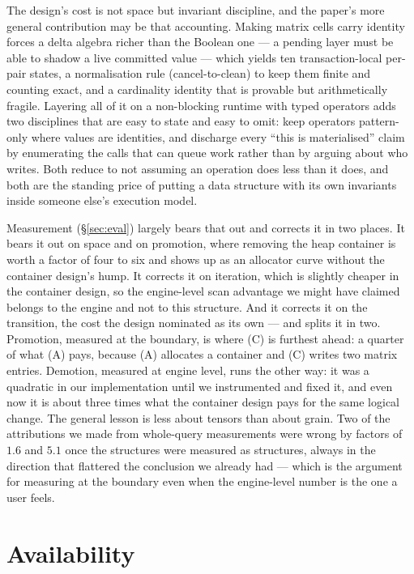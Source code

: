\documentclass[11pt,a4paper]{article}
\theoremstyle{plain}
\theoremstyle{definition}
\theoremstyle{remark}
\begin{document}
The design's cost is not space but invariant discipline, and the
paper's more general contribution may be that accounting. Making matrix cells
carry identity forces a delta algebra richer than the Boolean one --- a
pending layer must be able to shadow a live committed value --- which yields
ten transaction-local per-pair states, a normalisation rule
(cancel-to-clean) to keep them finite and counting exact, and a cardinality
identity that is provable but arithmetically fragile. Layering all of it on a
non-blocking runtime with typed operators adds two disciplines that are easy to
state and easy to omit: keep operators pattern-only where values are
identities, and discharge every ``this is materialised'' claim by enumerating
the calls that can queue work rather than by arguing about who writes. Both
reduce to not assuming an operation does less than it does, and both are the
standing price of putting a data structure with its own invariants inside
someone else's execution model.

Measurement (\S\ref{sec:eval}) largely bears that out and corrects it in two
places. It bears it out on space and on promotion, where removing the heap
container is worth a factor of four to six and shows up as an allocator curve
without the container design's hump. It corrects it on iteration, which is
slightly cheaper in the container design, so the engine-level scan advantage we
might have claimed belongs to the engine and not to this structure. And it
corrects it on the transition, the cost the design nominated as its own --- and
splits it in two. Promotion, measured at the boundary, is where (C) is furthest
ahead: a quarter of what (A) pays, because (A) allocates a container and (C)
writes two matrix entries. Demotion, measured at engine level, runs the other
way: it was a quadratic in our implementation until we instrumented and fixed
it, and even now it is about three times what the container design pays for the
same logical change. The
general lesson is less about tensors than about grain. Two of the attributions
we made from whole-query measurements were wrong by factors of $1.6$ and $5.1$
once the structures were measured as structures, always in the direction that
flattered the conclusion we already had --- which is the argument for measuring
at the boundary even when the engine-level number is the one a user feels.

\section*{Availability}
\end{document}
